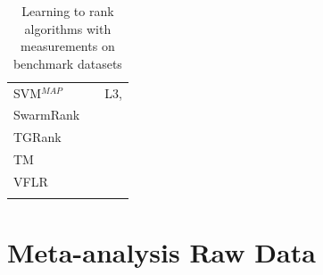 \documentclass[english, authoryear, preprint]{elsarticle}
\begin{document}
{\begin{longtable}{p{2.671cm}p{2.812cm}p{7.7cm}}
SVM$^{MAP}$ & \cite{Yue2007} & L3, \cite{Wang2012, Xu2008, Niu2012}\\
SwarmRank & \cite{Diaz-Aviles2009} & \cite{Sato2013}\\
TGRank & \cite{Lai2013} & \cite{Lai2013}\\
TM & \cite{Zhou2008} & \cite{Zhou2008, Papini2012, Tan2013}\\
VFLR & \cite{Cai2012} & \cite{Cai2012}\\
\bottomrule
\caption{Learning to rank algorithms with measurements on benchmark datasets}
\label{tab:ltr_methods_used}
\end{longtable}
}

\newpage
\section{Meta-analysis Raw Data}
\end{document}
